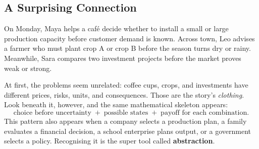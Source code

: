 	
	\subsection{A Surprising Connection}
	\label{sec:surprising-connection}
	
	On Monday, Maya helps a café decide whether to install a small or large
	production capacity before customer demand is known. Across town, Leo advises
	a farmer who must plant crop A or crop B before the season turns dry or rainy.
	Meanwhile, Sara compares two investment projects before the market proves weak
	or strong.
	
	At first, the problems seem unrelated: coffee cups, crops, and investments have
	different prices, risks, units, and consequences. Those are the story's
	\emph{clothing}. Look beneath it, however, and the same mathematical skeleton
	appears:
	\[
	\boxed{\text{choice before uncertainty}}
	\; + \;
	\boxed{\text{possible states}}
	\; + \;
	\boxed{\text{payoff for each combination}}.
	\]
	This pattern also appears when a company selects a production plan, a family
	evaluates a financial decision, a school enterprise plans output, or a
	government selects a policy. Recognising it is the super tool called
	\textbf{abstraction}.
	
	
	
